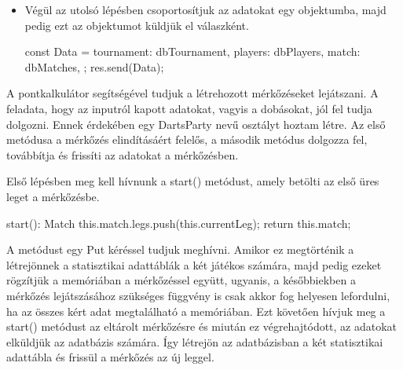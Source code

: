 \begin{itemize}
\begin{cpp}
{      const dbMatch = await NewMatchModel.create(newMatch);
      dbMatches.push(dbMatch);
    }
\end{cpp}
\item Végül az utolsó lépésben csoportosítjuk az adatokat egy objektumba, majd pedig ezt az objektumot küldjük el válaszként.
\begin{cpp}
const Data = {
      tournament: dbTournament,
      players: dbPlayers,
      match: dbMatches,
    };
    res.send(Data);
\end{cpp}
\end{itemize}
A pontkalkulátor segítségével tudjuk a létrehozott mérkőzéseket lejátszani. A feladata, hogy az inputról kapott adatokat, vagyis a dobásokat, jól fel tudja dolgozni. Ennek érdekében egy DartsParty nevű osztályt hoztam létre. Az első metódusa a mérkőzés elindításáért felelős, a második metódus dolgozza fel, továbbítja és frissíti az adatokat a mérkőzésben.

Első lépésben meg kell hívnunk a start() metódust, amely betölti az első üres leget a mérkőzésbe.
\begin{cpp}
  start(): Match {
    this.match.legs.push(this.currentLeg);
    return this.match;
  }
\end{cpp}

A metódust egy Put kéréssel tudjuk meghívni. Amikor ez megtörténik a létrejönnek a statisztikai adattáblák a két játékos számára, majd pedig ezeket rögzítjük a memóriában a mérkőzéssel együtt, ugyanis, a későbbiekben a mérkőzés lejátszásához szükséges függvény is csak akkor fog helyesen lefordulni, ha az összes kért adat megtalálható a memóriában. Ezt követően hívjuk meg a start() metódust az eltárolt mérkőzésre és miután ez végrehajtódott, az adatokat elküldjük az adatbázis számára. Így létrejön az adatbázisban a két statisztikai adattábla és frissül a mérkőzés az új leggel.

